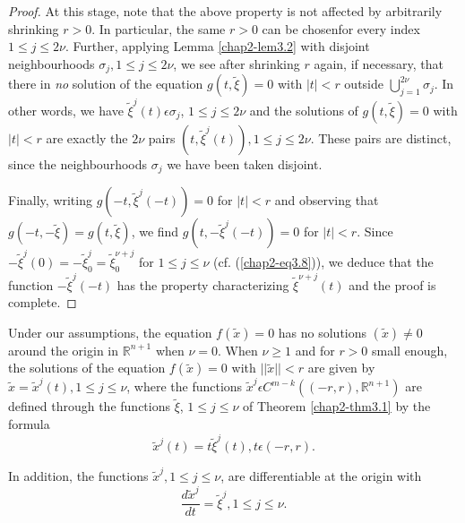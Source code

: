 \begin{proof}
At this stage, note that the above property is not affected by
arbitrarily shrinking $r > 0$. In particular, the same $r > 0$ can be
chosen\pageoriginale for every index $1 \leq j \leq 2\nu$. Further,
applying Lemma \ref{chap2-lem3.2} with disjoint neighbourhoods
$\sigma_{j}, 1 \leq j \leq 2\nu$, we see after shrinking $r$ again, if
necessary, that there in {\em no} solution of the equation $g(t,
\widetilde{\xi}) = 0$ with $|t| < r$ outside $\bigcup\limits_{j=1}^{2\nu}
\sigma_{j}$. In other words, we have $\widetilde{\xi}^{j} (t) \epsilon
\sigma_{j}$, $1 \leq j \leq 2\nu$ and the solutions of $g(t,
\widetilde{\xi}) = 0$ with $|t| < r$ are exactly the $2\nu$ pairs $(t,
\widetilde{\xi}^{j} (t)), 1 \leq j \leq 2\nu$. These pairs are
distinct, since the neighbourhoods $\sigma_{j}$ we have been taken
disjoint.

Finally, writing $g(-t, \widetilde{\xi}^{j}(-t)) = 0$ for $|t| < r$
and observing that $g(-t, -\widetilde{\xi}) = g(t, \widetilde{\xi})$,
we find $g(t, -\widetilde{\xi}^{j}(-t)) = 0$ for $|t| < r$. Since
$-\widetilde{\xi}^{j}(0) = -\widetilde{\xi}_{0}^{j} =
\widetilde{\xi}_{0}^{\nu+j}$ for $1 \leq j \leq \nu$
(cf. (\ref{chap2-eq3.8})), we deduce that the function
$-\widetilde{\xi}^{j}(-t)$ has the property characterizing
$\widetilde{\xi}^{\nu+j}(t)$ and the proof is complete.
\end{proof}

\begin{corollary}\label{chap2-coro3.1}
Under our assumptions, the equation $f(\widetilde{x}) = 0$ has no
solutions $(\widetilde{x}) \neq 0$ around the origin in
$\mathbb{R}^{n+1}$ when $\nu = 0$. When $\nu \geq 1$ and for $r > 0$
small enough, the solutions of the equation $f(\widetilde{x}) = 0$
with $||\widetilde{x}|| < r$ are given by $\widetilde{x} =
\widetilde{x}^{j}(t), 1 \leq j \leq \nu$, where the functions
$\widetilde{x}^{j} \epsilon C^{m-k} ((-r, r), \mathbb{R}^{n+1})$ are
defined through the functions $\widetilde{\xi}$, $1 \leq j \leq \nu$
of Theorem \ref{chap2-thm3.1} by the formula
$$
\widetilde{x}^{j}(t) = t\widetilde{\xi}^{j}(t), t \epsilon (-r, r).
$$

In addition, the functions $\widetilde{x}^{j}, 1 \leq j \leq \nu$,
are differentiable at the origin with 
$$
\frac{d\widetilde{x}^{j}}{dt} = \widetilde{\xi}^{j}, 1 \leq j \leq \nu.
$$
\end{corollary}

